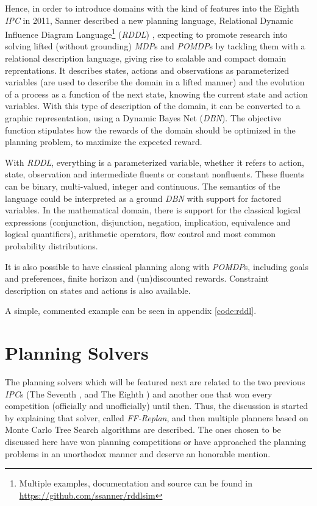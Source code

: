 Hence, in order to introduce domains with the kind of features into the Eighth
\textit{IPC} in 2011, Sanner described a new planning language, Relational
Dynamic Influence Diagram Language\footnote{Multiple examples, documentation and
source can be found in \url{https://github.com/ssanner/rddlsim}} (\textit{RDDL})
\cite{Sanner_RDDL}, expecting to promote research into solving lifted (without
grounding) \textit{MDP}s and \textit{POMDP}s by tackling them with a relational
description language, giving rise to scalable and compact domain reprentations.
It describes states, actions and observations as parameterized variables (are
used to describe the domain in a lifted manner) and the evolution of a process
as a function of the next state, knowing the current state and action variables.
With this type of description of the domain, it can be converted to a graphic
representation, using a Dynamic Bayes Net (\textit{DBN}). The objective function
stipulates how the rewards of the domain should be optimized in the planning
problem, to maximize the expected reward.

With \textit{RDDL}, everything is a parameterized variable, whether it refers to
action, state, observation and intermediate fluents or constant nonfluents.
These fluents can be binary, multi-valued, integer and continuous. The semantics
of the language could be interpreted as a ground \textit{DBN} with support for
factored variables. In the mathematical domain, there is support for the
classical logical expressions (conjunction, disjunction, negation, implication,
equivalence and logical quantifiers), arithmetic operators, flow control and
most common probability distributions.

It is also possible to have classical planning along with \textit{POMDP}s,
including goals and preferences, finite horizon and (un)discounted rewards.
Constraint description on states and actions is also available.

A simple, commented example can be seen in appendix \ref{code:rddl}.

\newpage

\section{Planning Solvers}

The planning solvers which will be featured next are related to the two previous
\textit{IPC}s (The Seventh \cite{Vallati2015}, and The Eighth \cite{Coles2012})
and another one that won every competition (officially and unofficially) until
then. Thus, the discussion is started by explaining that solver, called
\textit{FF-Replan}, and then multiple planners based on Monte Carlo Tree Search
algorithms are described. The ones chosen to be discussed here have won
planning competitions or have approached the planning problems in an unorthodox
manner and deserve an honorable mention.

